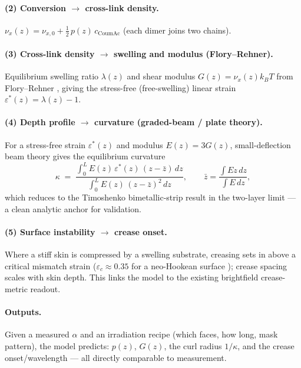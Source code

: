 \documentclass[11pt]{article}
\newcommand{\Coum}{\text{CoumAc}}
\begin{document}
\paragraph{(2) Conversion $\to$ cross-link density.}
$\nu_x(z) = \nu_{x,0} + \tfrac{1}{2}\,p(z)\,c_{\Coum}$ (each dimer joins two chains).

\paragraph{(3) Cross-link density $\to$ swelling and modulus (Flory--Rehner).}
Equilibrium swelling ratio $\lambda(z)$ and shear modulus
$G(z)=\nu_x(z) k_B T$ from Flory--Rehner \cite{floryrehner}, giving the stress-free
(free-swelling) linear strain $\varepsilon^*(z)=\lambda(z)-1$.

\paragraph{(4) Depth profile $\to$ curvature (graded-beam / plate theory).}
For a stress-free strain $\varepsilon^*(z)$ and modulus $E(z)=3G(z)$, small-deflection beam
theory gives the equilibrium curvature
\begin{equation}
  \kappa \;=\; \frac{\displaystyle\int_0^L E(z)\,\varepsilon^*(z)\,(z-\bar z)\,dz}
                    {\displaystyle\int_0^L E(z)\,(z-\bar z)^2\,dz},
  \qquad
  \bar z = \frac{\int E z\,dz}{\int E\,dz},
  \label{eq:curv}
\end{equation}
which reduces to the Timoshenko bimetallic-strip result \cite{timoshenko1925} in the
two-layer limit --- a clean analytic anchor for validation.

\paragraph{(5) Surface instability $\to$ crease onset.}
Where a stiff skin is compressed by a swelling substrate, creasing sets in above a critical
mismatch strain ($\varepsilon_c\!\approx\!0.35$ for a neo-Hookean surface
\cite{hong2009creasing}); crease spacing scales with skin depth. This links the model to the
existing brightfield crease-metric readout.

\paragraph{Outputs.} Given a measured $\alpha$ and an irradiation recipe (which faces, how
long, mask pattern), the model predicts: $p(z)$, $G(z)$, the curl radius $1/\kappa$, and the
crease onset/wavelength --- all directly comparable to measurement.
\end{document}
